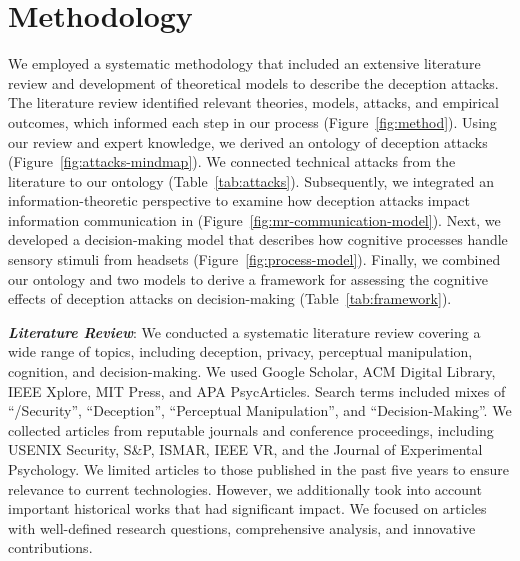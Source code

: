\section{Methodology}
\label{sec:methodology}


We employed a systematic methodology that included an extensive literature review and development of theoretical models to describe the \MR deception attacks.
The literature review identified relevant theories, models, attacks, and empirical outcomes, which informed each step in our process (Figure~\ref{fig:method}). 
Using our review and expert knowledge, we derived an ontology of \MR deception attacks (Figure~\ref{fig:attacks-mindmap}). 
We connected technical attacks from the literature to our ontology (Table~\ref{tab:attacks}).
Subsequently, we integrated an information-theoretic perspective to examine how deception attacks impact information communication in \MR (Figure~\ref{fig:mr-communication-model}). Next, we developed a decision-making model that describes how cognitive processes handle sensory stimuli from \MR headsets (Figure~\ref{fig:process-model}). Finally, we combined our ontology and two models to derive a framework for assessing the cognitive effects of \MR deception attacks on decision-making (Table~\ref{tab:framework}). %



\emph{\textbf{Literature Review}}: 
We conducted a systematic literature review covering a wide range of topics, including deception, privacy, perceptual manipulation, cognition, and decision-making.
We used Google Scholar, ACM Digital Library, IEEE Xplore, MIT Press, and APA PsycArticles. %
Search terms included mixes of ``\AR/\VR Security'', ``\MR Deception'', ``Perceptual Manipulation'', and ``Decision-Making''. 
We collected articles from reputable journals and conference proceedings, including  USENIX Security, S\&P, ISMAR, IEEE VR, and the Journal of Experimental Psychology. 
We limited articles to those published in the past five years to ensure relevance to current \MR technologies. 
However, we additionally took into account important historical works that had significant impact. %
We focused on articles %
with well-defined research questions, comprehensive analysis, and innovative contributions.

